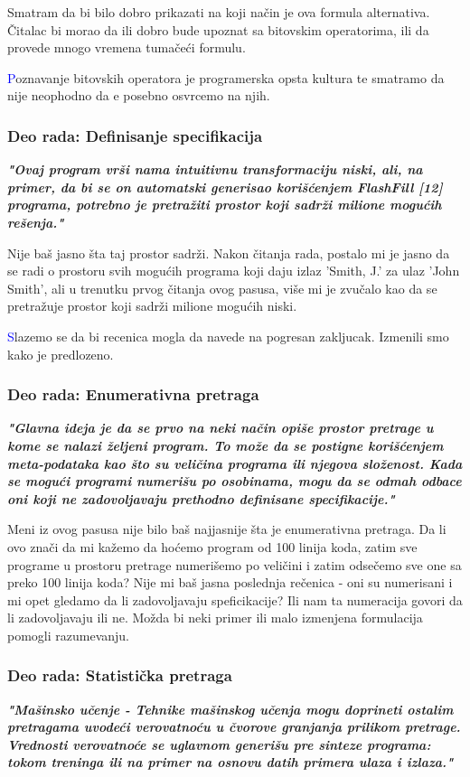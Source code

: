 \documentclass[a4paper]{report}
\newcommand{\odgovor}[1]{\textcolor{blue}{#1}}
\begin{document}
Smatram da bi bilo dobro prikazati na koji način je ova formula alternativa. Čitalac bi morao da ili dobro bude upoznat sa bitovskim operatorima, ili da provede mnogo vremena tumačeći formulu.

\odgovor Poznavanje bitovskih operatora je programerska opsta kultura te smatramo da nije neophodno da e posebno osvrcemo na njih.

\subsubsection{Deo rada: Definisanje specifikacija}
\textbf{\textit{"Ovaj program vrši nama intuitivnu transformaciju niski, ali, na primer,
da bi se on automatski generisao korišćenjem FlashFill [12] programa, potrebno je pretražiti prostor koji sadrži milione mogućih rešenja."}}

Nije baš jasno šta taj prostor sadrži. Nakon čitanja rada, postalo mi je jasno da se radi o prostoru svih mogućih programa koji daju izlaz 'Smith, J.' za ulaz 'John Smith', ali u trenutku prvog čitanja ovog pasusa, više mi je zvučalo kao da se pretražuje prostor koji sadrži milione mogućih niski.

\odgovor Slazemo se da bi recenica mogla da navede na pogresan zakljucak. Izmenili smo kako je predlozeno.

\subsubsection{Deo rada: Enumerativna pretraga}
\textbf{\textit{"Glavna ideja je da se prvo na neki način opiše prostor pretrage u kome se nalazi željeni program. To može da se postigne korišćenjem meta-podataka kao što su veličina programa ili
njegova složenost. Kada se mogući programi numerišu po osobinama, mogu da se odmah odbace oni koji ne zadovoljavaju prethodno definisane specifikacije."}}

Meni iz ovog pasusa nije bilo baš najjasnije šta je enumerativna pretraga. Da li ovo znači da mi kažemo da hoćemo program od 100 linija koda, zatim sve programe u prostoru pretrage numerišemo po veličini i zatim odsečemo sve one sa preko 100 linija koda? Nije mi baš jasna poslednja rečenica - oni su numerisani i mi opet gledamo da li zadovoljavaju speficikacije? Ili nam ta numeracija govori da li zadovoljavaju ili ne. Možda bi neki primer ili malo izmenjena formulacija pomogli razumevanju.


\subsubsection{Deo rada: Statistička pretraga}
\textbf{\textit{"Mašinsko učenje - Tehnike mašinskog učenja mogu doprineti ostalim pretragama uvodeći verovatnoću u čvorove granjanja prilikom pretrage. Vrednosti verovatnoće se uglavnom generišu pre sinteze programa: tokom treninga ili na primer na osnovu datih primera ulaza i izlaza."}}
\end{document}
